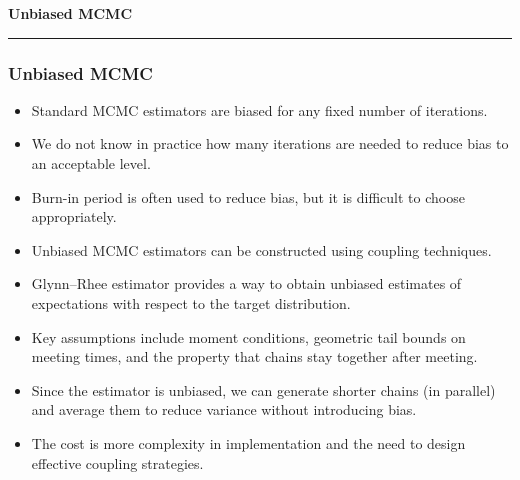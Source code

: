 
% 

\begin{frame}
	\vspace{2cm}
	\begin{center}
		{\Huge\textbf{\textcolor{copenhagenred}{Unbiased MCMC}}}
		\vspace{1cm}

		\rule{4cm}{3pt}
		\vspace{2cm}
	\end{center}
\end{frame}

\begin{frame}
	\frametitle{Unbiased MCMC}

	\begin{itemize}
		\item Standard MCMC estimators are biased for any fixed number of iterations.
		\item We do not know in practice how many iterations are needed to reduce bias to an acceptable level.
		\item Burn-in period is often used to reduce bias, but it is difficult to choose appropriately.
		\item Unbiased MCMC estimators can be constructed using coupling techniques.
		\item Glynn--Rhee estimator provides a way to obtain unbiased estimates of expectations with respect to the target distribution.
		\item Key assumptions include moment conditions, geometric tail bounds on meeting times, and the property that chains stay together after meeting.
		\item Since the estimator is unbiased, we can generate shorter chains (in parallel) and average them to reduce variance without introducing bias.
		\item The cost is more complexity in implementation and the need to design effective coupling strategies.
	\end{itemize}
\end{frame}

